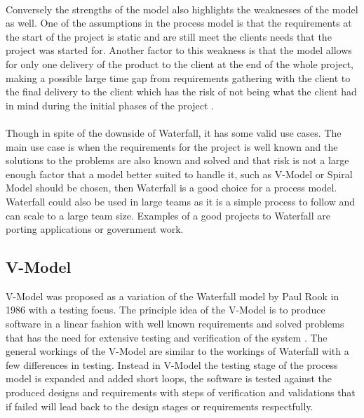 \documentclass{style/CRPITStyle}
\renewcommand{\cite}{\citep}
\begin{document}
\paragraph{}

Conversely the strengths of the model also highlights the weaknesses of the model as
well.
One of the assumptions in the process model is that the requirements at the start of the project is
static and are still meet the clients needs that the project was started for.
Another factor to this weakness is that the model allows for only one delivery of the product to
the client at the end of the whole project, making a possible large time gap from requirements 
gathering with the client to the final delivery to the client which has the risk of not being 
what the client had in mind during the initial phases of the project
\cite{McCracken:1982}.

\paragraph{}
Though in spite of the downside of Waterfall, it has some valid use cases.
The main use case is when the requirements for the project is well known and the
solutions to the problems are also known and solved and that risk is not a large
enough factor that a model better suited to handle it, such as V-Model or Spiral
Model should be chosen, then Waterfall is a good choice for a process model.
Waterfall could also be used in large teams as it is a simple process to follow
and can scale to a large team size.
Examples of a good projects to Waterfall are porting applications or government
work.

\subsection{V-Model} %

V-Model was proposed as a variation of the Waterfall model by Paul Rook in 1986
\cite{rook:1986:vmodel} with a testing focus.
The principle idea of the V-Model is to produce software in a linear fashion with
well known requirements and solved problems that has the need for extensive testing 
and verification of the system \cite{rook:1986:vmodel}.
The general workings of the V-Model are similar to the workings of Waterfall
with a few differences in testing.
Instead in V-Model the testing stage of the process model is expanded and added short loops,
the software is tested against the produced designs and requirements with
steps of verification and validations  that if failed will lead back to the design
stages or requirements respectfully.
\end{document}
